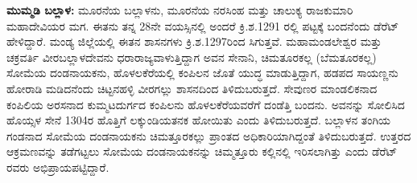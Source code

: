 \textbf{ಮುಮ್ಮಡಿ ಬಲ್ಲಾಳ: } ಮೂರನೆಯ ಬಲ್ಲಾಳನು, ಮೂರನೆಯ ನರಸಿಂಹ ಮತ್ತು ಚಾಲುಕ್ಯ ರಾಜಕುಮಾರಿ ಮಹಾದೇವಿಯರ ಮಗ. ಈತನು ತನ್ನ 28ನೇ ವಯಸ್ಸಿನಲ್ಲಿ ಅಂದರೆ ಕ್ರಿ.ಶ.1291 ರಲ್ಲಿ ಪಟ್ಟಕ್ಕೆ ಬಂದನೆಂದು ಡೆರೆಟ್​ ಹೇಳಿದ್ದಾರೆ. ಮಂಡ್ಯ ಜಿಲ್ಲೆಯಲ್ಲಿ ಈತನ ಶಾಸನಗಳು ಕ್ರಿ.ಶ.1297ರಿಂದ ಸಿಗುತ್ತವೆ. ಮಹಾಮಂಡಲೇಶ್ವರ ಮತ್ತು ಚಕ್ರವರ್ತಿ ವೀರಬಲ್ಲಾಳದೇವನು ಧರಾರಾಜ್ಯವಾಳುತ್ತಿದ್ದಾಗ ಅವನ ಸೇನಾನಿ, ಚಿಮತೂರಕಲ್ಲ (ಬೆಮತೂರಕಲ್ಲ) ಸೋಮೆಯ ದಂಡನಾಯಕನು, ಹೊಳಲಕೆರೆಯಲ್ಲಿ ಕಂಪಿಲನ ಜೊತೆ ಯುದ್ಧ ಮಾಡುತ್ತಿದ್ದಾಗ, ಹಡಪದ ಸಾಯಣ್ಣನು ಹೋರಾಡಿ ಮಡಿದನೆಂದು ಚಿಟ್ಟನಹಳ್ಳಿ ವೀರಗಲ್ಲು ಶಾಸನದಿಂದ ತಿಳಿದುಬರುತ್ತದೆ. ಸೇವುಣರ ಮಾಂಡಲಿಕನಾದ ಕಂಪಿಲಿಯ ಅರಸನಾದ ಕುಮ್ಮಟ\-ದುರ್ಗದ ಕಂಪಿಲನು ಹೊಳಲಕೆರೆಯವರೆಗೆ ದಂಡೆತ್ತಿ ಬಂದನು. ಅವನನ್ನು ಸೋಲಿಸಿದ ಹೊಯ್ಸಳ ಸೇನೆ 1304ರ ಹೊತ್ತಿಗೆ ಲಕ್ಕುಂಡಿಯತನಕ ಹೋಯಿತು ಎಂದು ತಿಳಿದುಬರುತ್ತದೆ. ಬಲ್ಲಾಳನ ತಂಗಿಯ ಗಂಡನಾದ ಸೋಮೆಯ ದಂಡನಾಯಕನು ಚಿಮತ್ತೂರಕಲ್ಲು ಪ್ರಾಂತದ ಅಧಿಕಾರಿಯಾಗಿದ್ದಂತೆ ತಿಳಿದುಬರುತ್ತದೆ. ಉತ್ತರದ ಆಕ್ರಮಣವನ್ನು ತಡೆಗಟ್ಟಲು ಸೋಮೆಯ ದಂಡನಾಯಕನನ್ನು ಚಿಮ್ಮತ್ತೂರು ಕಲ್ಲಿನಲ್ಲಿ ಇರಿಸಲಾಗಿತ್ತು ಎಂದು ಡೆರೆಟ್​ರವರು ಅಭಿಪ್ರಾಯಪಟ್ಟಿದ್ದಾರೆ.

